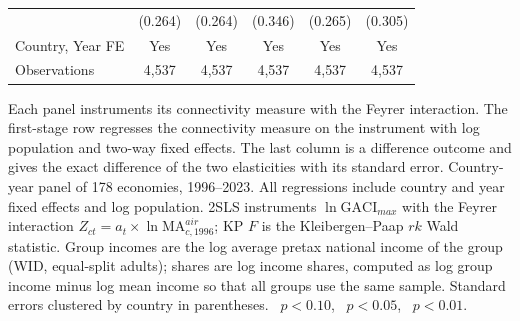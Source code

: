 \begin{table}[H]
\begin{minipage}{\linewidth}
{\begin{tabular}{lccccc}
 & (0.264) & (0.264) & (0.346) & (0.265) & (0.305) \\
\addlinespace
\midrule
Country, Year FE & Yes & Yes & Yes & Yes & Yes \\
Observations & 4{,}537 & 4{,}537 & 4{,}537 & 4{,}537 & 4{,}537 \\
\bottomrule
\end{tabular}}
\par\vspace{3pt}\begin{flushleft}\footnotesize Each panel instruments its connectivity measure with the Feyrer interaction. The first-stage row regresses the connectivity measure on the instrument with log population and two-way fixed effects. The last column is a difference outcome and gives the exact difference of the two elasticities with its standard error. Country-year panel of 178 economies, 1996--2023. All regressions include country and year fixed effects and log population. 2SLS instruments $\ln\mathrm{GACI}_{max}$ with the Feyrer interaction $Z_{ct}=a_t\times\ln\mathrm{MA}^{air}_{c,1996}$; KP $F$ is the Kleibergen--Paap $rk$ Wald statistic. Group incomes are the log average pretax national income of the group (WID, equal-split adults); shares are log income shares, computed as log group income minus log mean income so that all groups use the same sample. Standard errors clustered by country in parentheses. \sym{*}~$p<0.10$, \sym{**}~$p<0.05$, \sym{***}~$p<0.01$.\end{flushleft}
\end{minipage}
\end{table}
